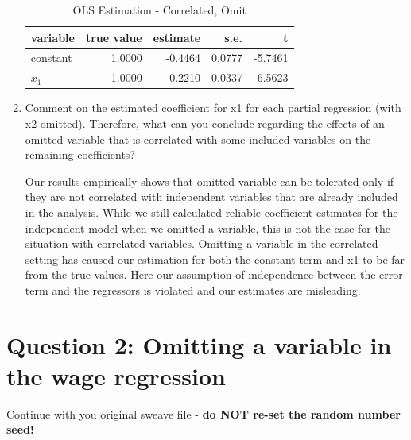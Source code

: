 \documentclass[11pt,reqno]{article}   %
\newcommand{\ksp}{\vspace{0.1in}}   %
\begin{document}
\begin{enumerate}
\begin{table}[!h]
\centering
\caption{OLS Estimation - Correlated, Omit} 
\begin{tabular}{lrrrr}
  \hline
variable & true value & estimate & s.e. & t \\ 
  \hline
constant & 1.0000 & -0.4464 & 0.0777 & -5.7461 \\ 
  $x_1$ & 1.0000 & 0.2210 & 0.0337 & 6.5623 \\ 
   \hline
\end{tabular}
\end{table}
\item
Comment on the estimated coefficient for x1 for each partial regression (with x2 omitted).
Therefore, what can you conclude regarding the effects of an omitted variable that is 
correlated with some included variables on the remaining coefficients?

\ksp

Our results empirically shows that omitted variable can be tolerated only if they are not correlated with independent variables that are already included in the analysis. While we still calculated reliable coefficient estimates for the independent model when we omitted a variable, this is not the case for the situation with correlated variables. Omitting a variable in the correlated setting has caused our estimation for both the constant term and x1 to be far from the true values. Here our assumption of independence between the error term and the regressors is violated and our estimates are misleading. 
\end{enumerate}



\newpage
\section*{Question 2: Omitting a variable in the wage regression}
Continue with you original sweave file - \textbf{do NOT re-set the random number seed!}\\
\end{document}
